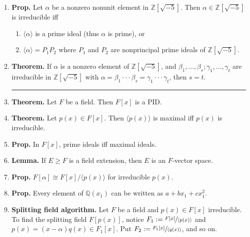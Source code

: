 \begin{enumerate}
	\item \textbf{Prop. } Let $\alpha$ be a nonzero nonunit element in $\mathbb{Z}[\sqrt{-5}]$. Then $\alpha \in \mathbb{Z}[\sqrt{-5}]$ is irreducible iff 
	\begin{enumerate}
		\item $\langle \alpha \rangle$ is a prime ideal (thus $\alpha$ is prime), or
		\item $\langle \alpha \rangle = P_1P_2$ where $P_1$ and $P_2$ are nonprincipal prime ideals of $\mathbb{Z}[\sqrt{-5}]$. 
	\end{enumerate}
	\item \textbf{Theorem. } If $\alpha$ is a nonzero element of $\mathbb{Z}[\sqrt{-5}]$, and $\beta_1,\dots,\beta_s; \gamma_1,\dots,\gamma_t$ are irreducible in $\mathbb{Z}[\sqrt{-5}]$ with $\alpha = \beta_1 \cdot \cdot \cdot \beta_s = \gamma_1 \cdot \cdot \cdot \gamma_t$, then $s=t$. 
	\begin{center}
		\hrule
	\end{center}
	\item \textbf{Theorem. } Let $F$ be a field. Then $F[x]$ is a PID. 
	\item \textbf{Theorem. } Let $p(x) \in F[x]$. Then $\langle p(x) \rangle$ is maximal iff $p(x)$ is irreducible. 
	\item \textbf{Prop. } In $F[x]$, prime ideals iff maximal ideals. 
	\item \textbf{Lemma. } If $E \geq F$ is a field extension, then $E$ is an $F$-vector space. 
	\item \textbf{Prop. } $F[\alpha] \cong F[x] / \langle p(x) \rangle$ for irreducible $p(x)$. 
	\item \textbf{Prop. } Every element of $\mathbb{Q}(x_1)$ can be written as $a+bx_1 + cx_1^2$. 
	\item \textbf{Splitting field algorithm. } Let $F$ be a field and $p(x) \in F[x]$ irreducible. To find the splitting field $F[p(x)]$, notice $F_1 := \sfrac{F[x]}{\langle p(x) \rangle}$ and $p(x) = (x-\alpha)q(x) \in F_1[x]$. Put $F_2 := \sfrac{F_1[x]}{\langle q(x) \rangle}$, and so on. 
\end{enumerate}


